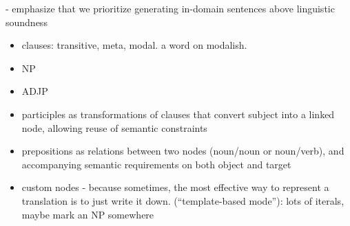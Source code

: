{- emphasize that we prioritize generating in-domain sentences above linguistic soundness




%

\begin{itemize}
\item clauses: transitive, meta, modal. a word on modalish. 
\item NP
\item ADJP
\item participles as transformations of clauses that convert subject into a linked node, allowing reuse of semantic constraints
\item prepositions as relations between two nodes (noun/noun or noun/verb), and accompanying semantic requirements on both object and target
\item custom nodes - because sometimes, the most effective way to represent a translation is to just write it down. (``template-based mode''): lots of iterals, maybe mark an NP somewhere


\end{itemize}}
